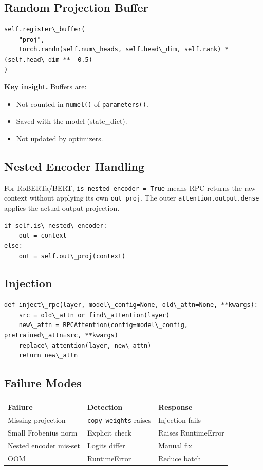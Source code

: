 \subsection{Random Projection Buffer}

\begin{lstlisting}
self.register\_buffer(
    "proj",
    torch.randn(self.num\_heads, self.head\_dim, self.rank) * (self.head\_dim ** -0.5)
)
\end{lstlisting}

\textbf{Key insight.} Buffers are:
\begin{itemize}
\item Not counted in \texttt{numel()} of \texttt{parameters()}.
\item Saved with the model (state\_dict).
\item Not updated by optimizers.

\end{itemize}
\subsection{Nested Encoder Handling}

For RoBERTa/BERT, \texttt{is\_nested\_encoder = True} means RPC returns the raw 
context without applying its own \texttt{out\_proj}. The outer \texttt{attention.output.dense} 
applies the actual output projection.

\begin{lstlisting}
if self.is\_nested\_encoder:
    out = context
else:
    out = self.out\_proj(context)
\end{lstlisting}

\subsection{Injection}

\begin{lstlisting}
def inject\_rpc(layer, model\_config=None, old\_attn=None, **kwargs):
    src = old\_attn or find\_attention(layer)
    new\_attn = RPCAttention(config=model\_config, pretrained\_attn=src, **kwargs)
    replace\_attention(layer, new\_attn)
    return new\_attn
\end{lstlisting}

\subsection{Failure Modes}

\begin{table}[H]
\centering
\small
\begin{tabular}{lll}
\toprule
\textbf{Failure} & \textbf{Detection} & \textbf{Response} \\
\midrule
Missing projection & \texttt{copy\_weights} raises & Injection fails \\
Small Frobenius norm & Explicit check & Raises RuntimeError \\
Nested encoder mis-set & Logits differ & Manual fix \\
OOM & RuntimeError & Reduce batch \\
\bottomrule
\end{tabular}
\end{table}

